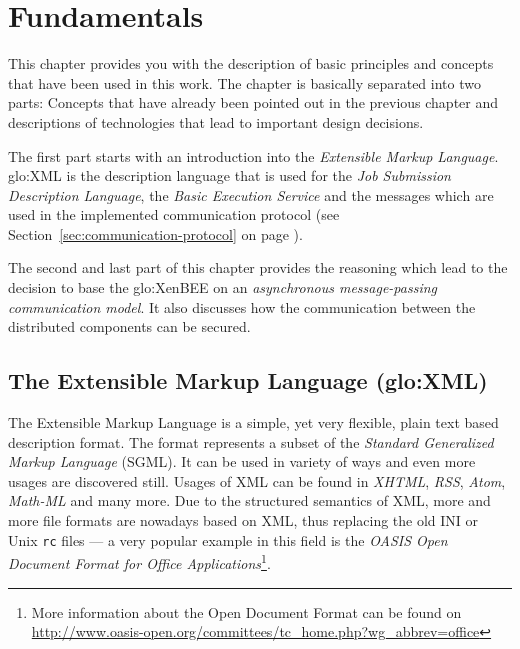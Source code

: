 
\chapter{Fundamentals}
\label{cha:fundamentals}

This chapter  provides you  with the description  of basic  principles and
concepts  that have  been  used in  this  work. The  chapter is  basically
separated into two  parts: Concepts that have already  been pointed out in
the  previous  chapter  and  descriptions  of technologies  that  lead  to
important design decisions.

The  first part  starts  with an  introduction  into the  \emph{Extensible
  Markup Language}. \gls{glo:XML} is the description language that is used
for  the  \emph{Job  Submission  Description  Language},  the  \emph{Basic
  Execution Service}  and the messages  which are used in  the implemented
communication  protocol  (see Section~\ref{sec:communication-protocol}  on
page \pageref{sec:communication-protocol}).

The second and last part of this chapter provides the reasoning which lead
to  the decision  to base  the \gls{glo:XenBEE}  on  an \emph{asynchronous
  message-passing  communication  model}.    It  also  discusses  how  the
communication between the distributed components can be secured.

\section[The Extensible Markup Language]
{The Extensible Markup Language (\gls{glo:XML})}
\label{sec:fundamentals:xml}

The Extensible Markup Language \cite{xml}  is a simple, yet very flexible,
plain text based description format. The format represents a subset of the
\emph{Standard  Generalized Markup Language}  (SGML).  It  can be  used in
variety of ways  and even more usages are discovered  still. Usages of XML
can be found in  \emph{XHTML}, \emph{RSS}, \emph{Atom}, \emph{Math-ML} and
many more.   Due to the  structured semantics of  XML, more and  more file
formats are  nowadays based  on XML,  thus replacing the  old INI  or Unix
\texttt{rc}  files  ---  a very  popular  example  in  this field  is  the
\emph{OASIS  Open Document  Format for  Office Applications}\footnote{More
  information   about  the   Open  Document   Format  can   be   found  on
  \url{http://www.oasis-open.org/committees/tc_home.php?wg_abbrev=office}}.

